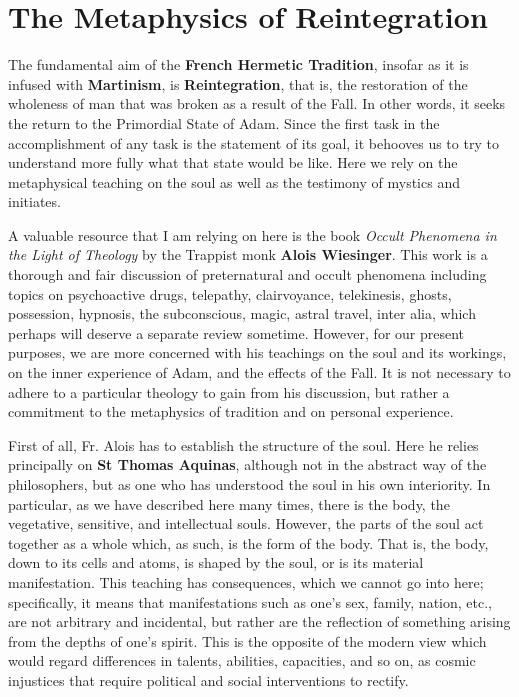 \section{The Metaphysics of Reintegration}

The fundamental aim of the \textbf{French Hermetic Tradition}, insofar as it is infused with \textbf{Martinism}, is \textbf{Reintegration}, that is, the restoration of the wholeness of man that was broken as a result of the Fall. In other words, it seeks the return to the Primordial State of Adam. Since the first task in the accomplishment of any task is the statement of its goal, it behooves us to try to understand more fully what that state would be like. Here we rely on the metaphysical teaching on the soul as well as the testimony of mystics and initiates.

A valuable resource that I am relying on here is the book \textit{Occult Phenomena in the Light of Theology} by the Trappist monk \textbf{Alois Wiesinger}. This work is a thorough and fair discussion of preternatural and occult phenomena including topics on psychoactive drugs, telepathy, clairvoyance, telekinesis, ghosts, possession, hypnosis, the subconscious, magic, astral travel, inter alia, which perhaps will deserve a separate review sometime. However, for our present purposes, we are more concerned with his teachings on the soul and its workings, on the inner experience of Adam, and the effects of the Fall. It is not necessary to adhere to a particular theology to gain from his discussion, but rather a commitment to the metaphysics of tradition and on personal experience.

First of all, Fr. Alois has to establish the structure of the soul. Here he relies principally on \textbf{St Thomas Aquinas}, although not in the abstract way of the philosophers, but as one who has understood the soul in his own interiority. In particular, as we have described here many times, there is the body, the vegetative, sensitive, and intellectual souls. However, the parts of the soul act together as a whole which, as such, is the form of the body. That is, the body, down to its cells and atoms, is shaped by the soul, or is its material manifestation. This teaching has consequences, which we cannot go into here; specifically, it means that manifestations such as one's sex, family, nation, etc., are not arbitrary and incidental, but rather are the reflection of something arising from the depths of one's spirit. This is the opposite of the modern view which would regard differences in talents, abilities, capacities, and so on, as cosmic injustices that require political and social interventions to rectify.

